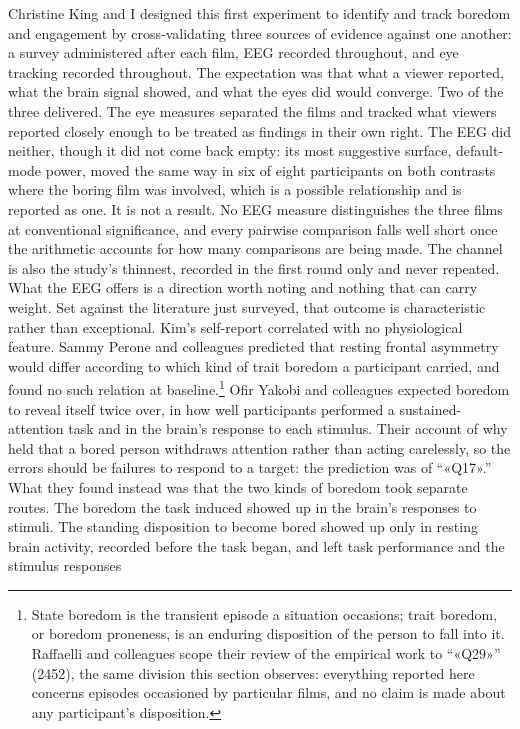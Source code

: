 Christine King and I designed this first experiment to identify and track boredom and
engagement by cross-validating three sources of evidence against one another: a survey
administered after each film, EEG recorded throughout, and eye tracking recorded throughout.
The expectation was that what a viewer reported, what the brain signal showed, and what the
eyes did would converge. Two of the three delivered. The eye measures separated the films and
tracked what viewers reported closely enough to be treated as findings in their own right. The
EEG did neither, though it did not come back empty: its most suggestive surface, default-mode
power, moved the same way in six of eight participants on both contrasts where the boring film
was involved, which is a possible relationship and is reported as one. It is not a result. No
EEG measure distinguishes the three films at conventional significance, and every pairwise
comparison falls well short once the arithmetic accounts for how many comparisons are being
made. The channel is also the study's thinnest, recorded in the first round only and never
repeated. What the EEG offers is a direction worth noting and nothing that can carry weight.
Set against the literature just surveyed, that outcome is characteristic rather than
exceptional. Kim's self-report correlated with no
physiological feature. Sammy
Perone and colleagues predicted that resting frontal asymmetry would differ according to which
kind of trait boredom a participant carried, and found no such relation at baseline.\footnote{
State boredom is the transient episode a situation occasions; trait boredom, or boredom
proneness, is an enduring disposition of the person to fall into it. Raffaelli and colleagues
scope their review of the empirical work to ``«Q29»'' (2452), the same division this section
observes: everything reported here concerns episodes occasioned by particular films, and no
claim is made about any participant's disposition.} Ofir Yakobi and colleagues expected boredom
to reveal itself twice over, in how well participants performed a sustained-attention task and
in the brain's response to each stimulus. Their account of why held that a bored person
withdraws attention rather than acting carelessly, so the errors should be failures to respond
to a target: the prediction was of ``«Q17».'' What they found instead was that the two kinds of
boredom took separate routes. The boredom the task induced showed up in the brain's responses
to stimuli. The standing disposition to become bored showed up only in resting brain activity,
recorded before the task began, and left task performance and the stimulus responses
